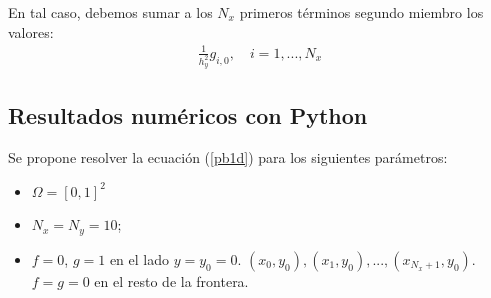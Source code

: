 \documentclass[11pt,spanish]{article}
\begin{document}
En tal caso, debemos sumar a los $N_x$ primeros términos segundo
miembro los valores:
\begin{align*}
  \frac{1}{h_y^2} g_{i,0}, \quad i=1,...,N_x
\end{align*}


\subsection{Resultados numéricos con Python}
Se propone resolver la ecuación (\ref{pb1d}) para los siguientes
parámetros:
\begin{itemize}
\item $\Omega=[0,1]^2$
\item $N_x=N_y=10$;
\item $f=0$, $g=1$ en el lado $y=y_0=0$.
  $(x_0,y_0), (x_1,y_0),...,(x_{N_x+1},y_0)$. $f=g=0$ en el resto de
  la frontera.
\end{itemize}
\end{document}
